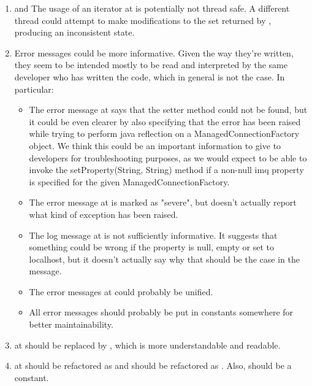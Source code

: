 \begin{enumerate}
	\item {} and  The usage of an iterator at  is potentially not thread safe. A different thread could attempt to make modifications to the set returned by , producing an inconsistent state. 
	\item {} Error messages could be more informative. Given the way they're written, they seem to be intended mostly to be read and interpreted by the same developer who has written the code, which in general is not the case. In particular:
		\begin{itemize}
			\item The error message at  says that the setter method could not be found, but it could be even clearer by also specifying that the error has been raised while trying to perform java reflection on a ManagedConnectionFactory object. We think this could be an important information to give to developers for troubleshooting purposes, as we would expect to be able to invoke the setProperty(String, String) method if a non-null imq property is specified for the given ManagedConnectionFactory. 
			\item The error message at  is marked as "severe", but doesn't actually report what kind of exception has been raised. 
			\item The log message at  is not sufficiently informative. It suggests that something could be wrong if the  property is null, empty or set to localhost, but it doesn't actually say why that should be the case in the message. 
			\item The error messages at  could probably be unified. 
			\item All error messages should probably be put in constants somewhere for better maintainability. 
		\end{itemize}
	\item {}  at  should be replaced by , which is more understandable and readable.
	\item {}  at  should be refactored as  and  should be refactored as . Also,  should be a constant. 

\end{enumerate}
